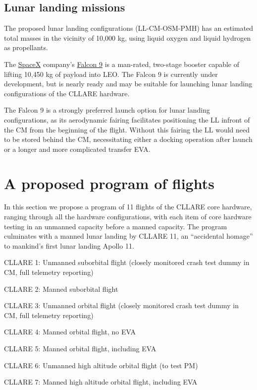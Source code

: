 \documentclass{report}
\begin{document}
\subsection{Lunar landing missions}

The proposed lunar landing configurations (LL-CM-OSM-PMH) has an estimated total masses in the vicinity of 10,000 kg, using liquid oxygen and liquid hydrogen as propellants.

The \href{http://spacex.com}{SpaceX} company's \href{http://spacex.com/falcon9.php}{Falcon 9} is a man-rated, two-stage booster capable of lifting 10,450 kg of payload into LEO.  The Falcon 9 is currently under development, but is nearly ready and may be suitable for launching lunar landing configurations of the CLLARE hardware.

The Falcon 9 is a strongly preferred launch option for lunar landing configurations, as its aerodynamic fairing facilitates positioning the LL infront of the CM from the beginning of the flight.  Without this fairing the LL would need to be stored behind the CM, necessitating either a docking operation after launch or a longer and more complicated transfer EVA.

\section{A proposed program of flights}

In this section we propose a program of 11 flights of the CLLARE core hardware, ranging through all the hardware configurations, with each item of core hardware testing in an unmanned capacity before a manned capacity.  The program culminates with a manned lunar landing by CLLARE 11, an ``accidental homage'' to mankind's first lunar landing Apollo 11.

CLLARE 1: Unmanned suborbital flight (closely monitored crash test dummy in CM, full telemetry reporting)

CLLARE 2: Manned suborbital flight

CLLARE 3: Unmanned orbital flight (closely monitored crash test dummy in CM, full telemetry reporting)

CLLARE 4: Manned orbital flight, no EVA

CLLARE 5: Manned orbital flight, including EVA

CLLARE 6: Unmanned high altitude orbital flight (to test PM)

CLLARE 7: Manned high altitude orbital flight, including EVA
\end{document}
